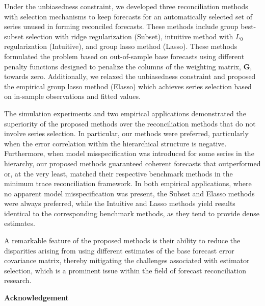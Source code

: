 \documentclass[11pt,a4paper,]{article}
\begin{document}
Under the unbiasedness constraint, we developed three reconciliation
methods with selection mechanisms to keep forecasts for an automatically
selected set of series unused in forming reconciled forecasts. These
methods include group best-subset selection with ridge regularization
(Subset), intuitive method with \(L_0\) regularization (Intuitive), and
group lasso method (Lasso). These methods formulated the problem based
on out-of-sample base forecasts using different penalty functions
designed to penalize the columns of the weighting matrix,
\(\boldsymbol{G}\), towards zero. Additionally, we relaxed the
unbiasedness constraint and proposed the empirical group lasso method
(Elasso) which achieves series selection based on in-sample observations
and fitted values.

The simulation experiments and two empirical applications demonstrated
the superiority of the proposed methods over the reconciliation methods
that do not involve series selection. In particular, our methods were
preferred, particularly when the error correlation within the
hierarchical structure is negative. Furthermore, when model
misspecification was introduced for some series in the hierarchy, our
proposed methods guaranteed coherent forecasts that outperformed or, at
the very least, matched their respective benchmark methods in the
minimum trace reconciliation framework. In both empirical applications,
where no apparent model misspecification was present, the Subset and
Elasso methods were always preferred, while the Intuitive and Lasso
methods yield results identical to the corresponding benchmark methods,
as they tend to provide dense estimates.

A remarkable feature of the proposed methods is their ability to reduce
the disparities arising from using different estimates of the base
forecast error covariance matrix, thereby mitigating the challenges
associated with estimator selection, which is a prominent issue within
the field of forecast reconciliation research.

\textbf{\large{Acknowledgement}}

\printbibliography
\end{document}
